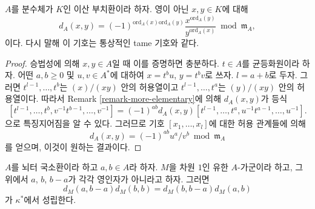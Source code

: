 \begin{lemma}
\label{lemma-symbol-is-usual-tame-symbol}
$A$를 분수체가 $K$인 이산 부치환이라 하자. 영이 아닌
$x, y \in K$에 대해
$$
d_A(x, y)
=
(-1)^{\text{ord}_A(x)\text{ord}_A(y)}
\frac{x^{\text{ord}_A(y)}}{y^{\text{ord}_A(x)}} \bmod \mathfrak m_A,
$$
이다. 다시 말해 이 기호는 통상적인 tame 기호와 같다.
\end{lemma}

\begin{proof}
승법성에 의해 $x, y \in A$일 때 이를 증명하면 충분하다.
$t \in A$를 균등화원이라 하자. 어떤 $a, b \geq 0$ 및
$u, v \in A^*$에 대하여 $x = t^bu$, $y = t^bv$로 쓰자.
$l = a + b$로 두자. 그러면 $t^{l - 1}, \ldots, t^b$는
$(x)/(xy)$ 안의 허용열이고 $t^{l - 1}, \ldots, t^a$는
$(y)/(xy)$ 안의 허용열이다. 따라서 Remark
\ref{remark-more-elementary}에 의해 $d_A(x, y)$가 등식
$$
[t^{l - 1}, \ldots, t^b, v^{-1}t^{b - 1}, \ldots, v^{-1}]
=
(-1)^{ab} d_A(x, y)
[t^{l - 1}, \ldots, t^a, u^{-1}t^{a - 1}, \ldots, u^{-1}].
$$
으로 특징지어짐을 알 수 있다. 그러므로 기호
$[x_1, \ldots, x_l]$에 대한 허용 관계들에 의해
$$
d_A(x, y) = (-1)^{ab} u^a/v^b \bmod \mathfrak m_A
$$
를 얻으며, 이것이 원하는 결과이다.
\end{proof}

\begin{lemma}
\label{lemma-symbol-is-steinberg-prepare}
$A$를 뇌터 국소환이라 하고 $a, b \in A$라 하자.
$M$을 차원 $1$인 유한 $A$-가군이라 하고, 그 위에서
$a$, $b$, $b - a$가 각각 영인자가 아니라고 하자. 그러면
$$
d_M(a, b - a)d_M(b, b) = d_M(b, b - a)d_M(a, b)
$$
가 $\kappa^*$에서 성립한다.
\end{lemma}

